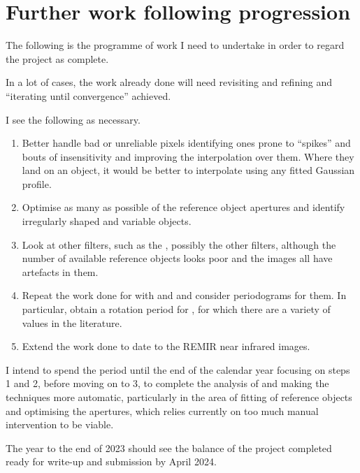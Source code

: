 \section{Further work following progression}
\protect\label{section:worktocome}

The following is the programme of work I need to undertake in order to regard
the project as complete.

In a lot of cases, the work already done will need revisiting and refining and
``iterating until convergence'' achieved.

I see the following as necessary.

\begin{enumerate}
  \item Better handle bad or unreliable pixels identifying ones prone to
  ``spikes'' and bouts of insensitivity and improving the interpolation over
  them. Where they land on an object, it would be better to interpolate using
  any fitted Gaussian profile.
  \item Optimise as many as possible of the reference object apertures and
  identify irregularly shaped and variable objects.
  \item Look at other filters, such as the \gfilter, possibly the other filters,
  although the number of available reference objects looks poor and the
  {\zfilter} images all have artefacts in them.
  \item Repeat the work done for {\ross} with {\prox} and {\bstar} and consider
  periodograms for them. In particular, obtain a rotation period for \bstar,
  for which there are a variety of values in the literature. 
  \item Extend the work done to date to the REMIR near infrared images.
\end{enumerate}

I intend to spend the period until the end of the calendar year focusing on
steps 1 and 2, before moving on to 3, to complete the analysis of {\ross} and
making the techniques more automatic, particularly in the area of
fitting of reference objects and optimising the apertures, which relies
currently on too much manual intervention to be viable.

The year to the end of 2023 should see the balance of the project completed
ready for write-up and submission by April 2024.

